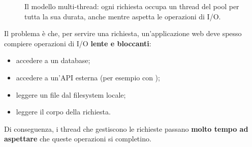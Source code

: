 \begin{figure}[H]
  \caption{Il modello multi-thread: ogni richiesta occupa un thread del pool
           per tutta la sua durata, anche mentre aspetta le operazioni di I/O.}
  \label{fig:multithread}
\end{figure}

Il problema è che, per servire una richiesta, un'applicazione web deve spesso
compiere operazioni di I/O \textbf{lente e bloccanti}:

\begin{itemize}
  \item accedere a un database;
  \item accedere a un'API esterna (per esempio con );
  \item leggere un file dal filesystem locale;
  \item leggere il corpo della richiesta.
\end{itemize}

Di conseguenza, i thread che gestiscono le richieste passano \textbf{molto
tempo ad aspettare} che queste operazioni si completino.

